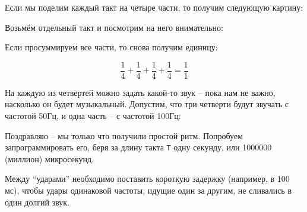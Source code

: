 \documentclass[../sparc.tex]{subfiles}
\begin{document}
Если мы поделим каждый такт на четыре части, то получим следующую картину:


Возьмём отдельный такт и посмотрим на него внимательно:


Если просуммируем все части, то снова получим единицу:

\begin{equation}
  \frac{1}{4} + \frac{1}{4} + \frac{1}{4} + \frac{1}{4} = \frac{1}{1}
\end{equation}

На каждую из четвертей можно задать какой-то звук -- пока нам не важно, насколько
он будет музыкальный. Допустим, что три четверти будут звучать с частотой 50Гц,
и одна часть -- с частотой 100Гц:


Поздравляю -- мы только что получили простой ритм. Попробуем запрограммировать
его, беря за длину такта \texttt{T} одну секунду, или 1000000 (миллион)
микросекунд.

Между ``ударами'' необходимо поставить короткую задержку (например, в 100 мс),
чтобы удары одинаковой частоты, идущие один за другим, не сливались в один
долгий звук.
\end{document}
